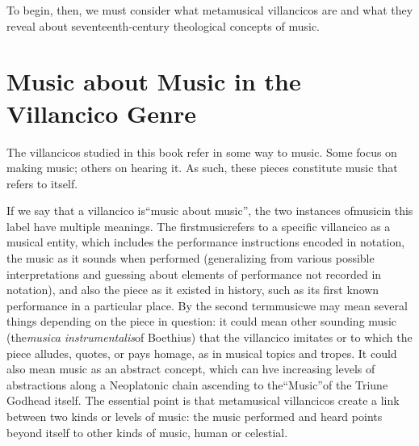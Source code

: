 \documentclass{memoir}
\begin{document}
To begin, then, we must consider what metamusical villancicos are and what they reveal about seventeenth-century theological concepts of music.

\section{Music about Music in the Villancico Genre}
    
\label{ch1:music-about-music}

The villancicos studied in this book refer in some way to music. Some focus on making music; others on hearing it. As such, these pieces constitute music that refers to itself.

If we say that a villancico is\enquote{music about music}, the two instances ofmusicin this label have multiple meanings. The firstmusicrefers to a specific villancico as a musical entity, which includes the performance instructions encoded in notation, the music as it sounds when performed (generalizing from various possible interpretations and guessing about elements of performance not recorded in notation), and also the piece as it existed in history, such as its first known performance in a particular place. By the second termmusicwe may mean several things depending on the piece in question: it could mean other sounding music (the\emph{musica instrumentalis}of Boethius) that the villancico imitates or to which the piece alludes, quotes, or pays homage, as in musical topics and tropes. It could also mean music as an abstract concept, which can hve increasing levels of abstractions along a Neoplatonic chain ascending to the\enquote{Music}of the Triune Godhead itself. The essential point is that metamusical villancicos create a link between two kinds or levels of music: the music performed and heard points beyond itself to other kinds of music, human or celestial.
\end{document}

